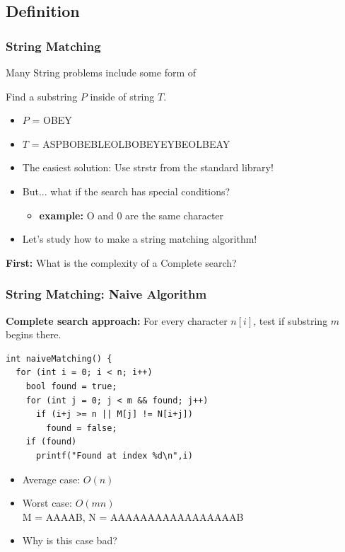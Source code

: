 \subsection{Definition}

\begin{frame}
  \frametitle{String Matching}

  {\smaller
  \begin{block}{}
    Many String problems include some form of 

    \medskip

    Find a substring $P$ inside of string $T$.
  \end{block}
  \begin{itemize}
  \item $P$ = OBEY
  \item $T$ = ASPBOBEBLEOLB\alert{OBEY}EYBEOLBEAY
  \end{itemize}

  \bigskip

  \begin{block}{}
    \begin{itemize}
    \item The easiest solution: Use strstr from the standard library!
    \item But... what if the search has special conditions?
    \begin{itemize}
      \item {\bf example:} O and 0 are the same character
    \end{itemize}
    \item Let's study how to make a string matching algorithm!
    \end{itemize}
  \end{block}

  {\bf First:} What is the complexity of a Complete search?

  }
\end{frame}

\begin{frame}[fragile]
  \frametitle{String Matching: Naive Algorithm}

  {\bf Complete search approach:} For every character $n[i]$, test if
  substring $m$ begins there.\bigskip

  \begin{exampleblock}{}
\begin{verbatim}
int naiveMatching() {
  for (int i = 0; i < n; i++)
    bool found = true;
    for (int j = 0; j < m && found; j++)
      if (i+j >= n || M[j] != N[i+j])
        found = false;
    if (found)
      printf("Found at index %d\n",i)
\end{verbatim}
  \end{exampleblock}
    \bigskip
    \begin{itemize}
      \item Average case: $O(n)$
      \item Worst case: $O(mn)$\\M = AAAAB, N = AAAAAAAAAAAAAAAAAB
      \item Why is this case bad?
    \end{itemize}
\end{frame}

